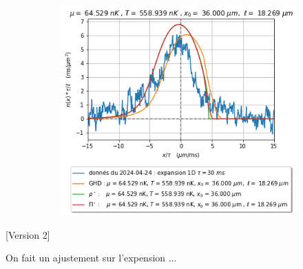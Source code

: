 \documentclass[a3, 10pt,twoside]{article}          %
\theoremstyle{plain}
\theoremstyle{definition}
\theoremstyle{remark}
\theoremstyle{definition} %
\begin{document}
\begin{figure}[H]
\begin{subfigure}[b]{0.32\textwidth}
        \caption{}
        \label{fig:expansion_1_expansion}
    \end{subfigure}
    \hfill
    \begin{subfigure}[b]{0.32\textwidth}
        \centering
        \includegraphics[width=\textwidth]{Figures/simul_expansion_30_expansion_36}
        \caption{}
        \label{}
    \end{subfigure}
    
    
    
    \caption{}
    


    
    \label{}
\end{figure}
	
	
	[Version 2]
	
	On fait un ajustement sur l'expension ... 
	
\end{document}
